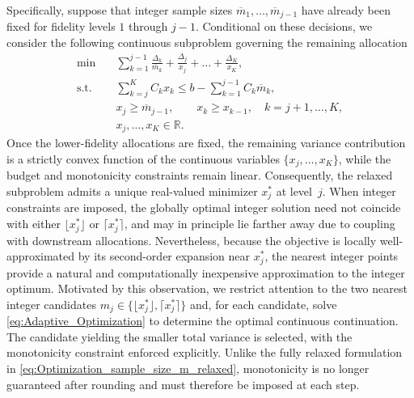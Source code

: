 Specifically, suppose that integer sample sizes $\overline{m}_1,\ldots,\overline{m}_{j-1}$ have already been fixed for fidelity levels $1$ through $j-1$. Conditional on these decisions, we consider the following continuous subproblem governing the remaining allocation
%
\begin{subequations}\label{eq:Adaptive_Optimization}
\begin{align}
    \min \quad & \sum_{k=1}^{j-1}\frac{\Delta_k}{\overline{m}_k}
    + \frac{\Delta_j}{x_j}
    + \ldots + \frac{\Delta_K}{x_K},\\
    \text{s.t.} \quad &\sum_{k=j}^K C_k x_k \le b - \sum_{k=1}^{j-1} C_k\overline{m}_k, \\
    & x_j \ge \overline{m}_{j-1},\qquad x_k \ge x_{k-1}, \quad k=j+1,\ldots,K, \label{eq:Adaptive_Optimization_obj_c}\\
    & x_j,\ldots,x_K \in \mathbb{R}.
\end{align}
\end{subequations}
%
Once the lower-fidelity allocations are fixed, the remaining variance contribution is a strictly convex function of the continuous variables $\{x_j,\ldots,x_K\}$, while the budget and monotonicity constraints remain linear. Consequently, the relaxed subproblem admits a unique real-valued minimizer $x_j^*$ at level~$j$. When integer constraints are imposed, the globally optimal integer solution need not coincide with either $\lfloor x_j^* \rfloor$ or $\lceil x_j^* \rceil$, and may in principle lie farther away due to coupling with downstream allocations. Nevertheless, because the objective is locally well-approximated by its second-order expansion near $x_j^*$, the nearest integer points provide a natural and computationally inexpensive approximation to the integer optimum. Motivated by this observation, we restrict attention to the two nearest integer candidates $m_j \in \{\lfloor x_j^* \rfloor, \lceil x_j^* \rceil\}$ and, for each candidate, solve \eqref{eq:Adaptive_Optimization} to determine the optimal continuous continuation. The candidate yielding the smaller total variance is selected, with the monotonicity constraint enforced explicitly. Unlike the fully relaxed formulation in \eqref{eq:Optimization_sample_size_m_relaxed}, monotonicity is no longer guaranteed after rounding and must therefore be imposed at each step.

